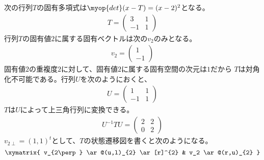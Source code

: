 	\begin{example}[対角化できない行列]\label{eg:対角化できない行列} %
		次の行列$T$の固有多項式は$\myop{det}(x-T)=(x-2)^2$となる。
		\begin{equation*}\begin{split} %
			T = \begin{pmatrix}
				3 & 1 \\ -1 & 1
			\end{pmatrix}
		\end{split}\end{equation*} %
		行列$T$の固有値$2$に属する固有ベクトルは次の$v_2$のみとなる。
		\begin{equation*}\begin{split} %
			v_2 = \begin{pmatrix}
				1 \\ -1
			\end{pmatrix}
		\end{split}\end{equation*} %
		固有値$2$の重複度$2$に対して、固有値$2$に属する固有空間の次元は$1$だから
		$T$は対角化不可能である。行列$U$を次のようにおくと、
		\begin{equation*}\begin{split} %
			U = \begin{pmatrix}
				1 & 1 \\ -1 & 1
			\end{pmatrix}
		\end{split}\end{equation*} %
		$T$は$U$によって上三角行列に変換できる。
		\begin{equation*}\begin{split} %
			U^{-1}TU = \begin{pmatrix}
				2 & 2 \\ 0 & 2
			\end{pmatrix}
		\end{split}\end{equation*} %
		$v_{2\perp}=(1,1)^t$として、$T$の状態遷移図を書くと次のようになる。
		\begin{equation*}\xymatrix{
			v_{2\perp} \ar@(u,l)_{2} \ar[r]^{2} & v_2 \ar@(r,u)_{2}
		}\end{equation*}
	\end{example} %

